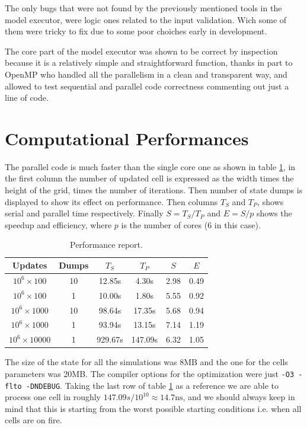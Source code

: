 \documentclass[Lau]{sapthesis} %
\let\oldsection\section
\def\subsection{\oldsection}
\def\section{\chapter}
\begin{document}
The only bugs that were not found by the previously mentioned tools in the model
executor, were logic ones related to the input validation. Wich some of them
were tricky to fix due to some poor choiches early in development.

The core part of the model executor was shown to be correct by inspection
because it is a relatively simple and straightforward function, thanks in part
to OpenMP who handled all the parallelism in a clean and transparent way, and
allowed to test sequential and parallel code correctness commenting out just a
line of code.

\subsection{Computational Performances}

The parallel code is much faster than the single core one as shown in table
\ref{tab:performance}, in the first column the number of updated cell is
expressed as the width times the height of the grid, times the number of
iterations. Then number of state dumps is displayed to show its effect on
performance. Then columns $T_S$ and $T_P$, shows serial and parallel time
respectively. Finally $S = T_S/T_P$ and $E = S/p$ shows the speedup and
efficiency, where $p$ is the number of cores (6 in this case).

\begin{table}
\centering
\begin{tabular}{|c|c|c|c|c|c|}
\hline
\textbf{Updates} & \textbf{Dumps} & \textbf{$T_S$} & \textbf{$T_P$} & \textbf{$S$} & \textbf{$E$}\\
\hline
$10^6\times 100$ & 10 & 12.85s & 4.30s & 2.98 & 0.49\\
$10^6\times 100$ & 1 & 10.00s & 1.80s & 5.55 & 0.92\\
$10^6\times 1000$ & 10 & 98.64s & 17.35s & 5.68 & 0.94\\
$10^6\times 1000$ & 1 & 93.94s & 13.15s & 7.14 & 1.19\\
$10^6\times 10000$ & 1 & 929.67s & 147.09s & 6.32 & 1.05\\
\hline
\end{tabular}
\caption{Performance report.}
\label{tab:performance}
\end{table}

The size of the state for all the simulations was 8MB and the one for the cells
parameters was 20MB. The compiler options for the optimization were just
\texttt{-O3 -flto -DNDEBUG}. Taking the last row of table \ref{tab:performance}
as a reference we are able to process one cell in roughly $147.09s/10^{10}
\approx 14.7\textrm{ns}$, and we should always keep in mind that this is
starting from the worst possible starting conditions i.e. when all cells are on
fire.
\end{document}
